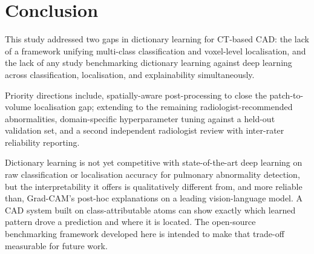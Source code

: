 \documentclass[conference]{IEEEtran}
\begin{document}
\section{Conclusion}
This study addressed two gaps in dictionary learning for CT-based CAD: the lack of a framework unifying
multi-class classification and voxel-level localisation, and the lack of any study benchmarking dictionary
learning against deep learning across classification, localisation, and explainability simultaneously. 

Priority directions include, spatially-aware post-processing to close the patch-to-volume localisation gap; extending
to the remaining radiologist-recommended abnormalities, domain-specific hyperparameter tuning
against a held-out validation set, and a second independent radiologist review with inter-rater reliability
reporting.

Dictionary learning is not yet competitive with state-of-the-art deep learning on raw classification or
localisation accuracy for pulmonary abnormality detection, but the interpretability it offers is qualitatively
different from, and more reliable than, Grad-CAM's post-hoc
explanations on a leading vision-language model. A CAD system built on class-attributable atoms can show
exactly which learned pattern drove a prediction and where it is located.
The open-source benchmarking framework developed here is intended to make
that trade-off measurable for future work.



\end{document}
